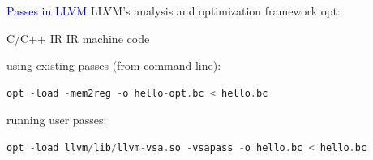\begin{frame}[fragile]{\textcolor{blue}{Passes in LLVM}}
LLVM's analysis and optimization framework {\color{blue} opt}:

\begin{center}
C/C++ 
IR
IR
machine code
\end{center}

\vspace{-0.3cm}

\hspace{4.4cm}

\vspace{0.9cm}

using existing passes (from command line):
\begin{footnotesize}
\begin{lstlisting}[language=C++]
opt -load -mem2reg -o hello-opt.bc < hello.bc
\end{lstlisting}
\end{footnotesize}
running user passes:
\begin{footnotesize}
\begin{lstlisting}[language=C++]
opt -load llvm/lib/llvm-vsa.so -vsapass -o hello.bc < hello.bc
\end{lstlisting}
\end{footnotesize}

\end{frame}
